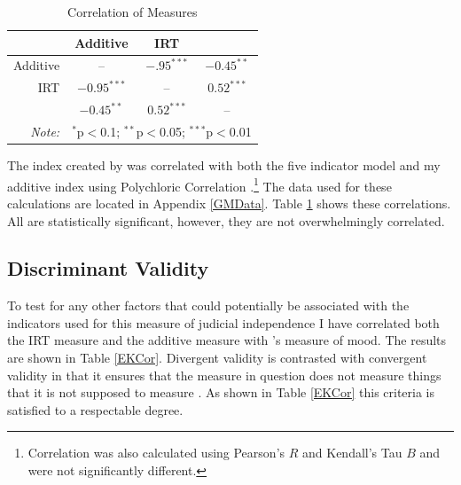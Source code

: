 \documentclass[12pt]{article}
\begin{document}
\begin{table}[ht]
	\centering\caption{Correlation of Measures}\label{Correlation}
	\begin{tabular}{rccc}
		\hline
		& Additive & IRT & \citeauthor{Melton2014} \\ 
		\hline
		Additive & -- & $-.95^{***}$ &$-0.45^{**}$ \\ 
		IRT & $-0.95^{***}$ & -- & $0.52^{***}$ \\ 
		\citeauthor{Melton2014} & $-0.45^{**}$  &  $0.52^{***}$ & --\\ 
		\hline
		\textit{Note:}  & \multicolumn{3}{l}{$^{*}$p$<$0.1; $^{**}$p$<$0.05; $^{***}$p$<$0.01} \\
	\end{tabular}
\end{table}

The index created by \citet{Melton2014} was correlated with both the five indicator model and my additive index using Polychloric Correlation \citep{Olsson1979}.\footnote{Correlation was also calculated using Pearson's $R$ and Kendall's Tau $B$ and were not significantly different.}  The data used for these calculations are located in Appendix \ref{GMData}.  Table \ref{Correlation} shows these correlations.  All are statistically significant, however, they are not overwhelmingly correlated.  

\subsection*{Discriminant Validity}
To test for any other factors that could potentially be associated with the indicators used for this measure of judicial independence I have correlated both the IRT measure and the additive measure with \citet{Enns2013}'s measure of mood.  The results are shown in Table \ref{EKCor}.  Divergent validity is contrasted with convergent validity in that it ensures that the measure in question does not measure things that it is not supposed to measure \citep{Campbell1959,Jackman2008}.  As shown in Table \ref{EKCor} this criteria is satisfied to a respectable degree.
\end{document}
